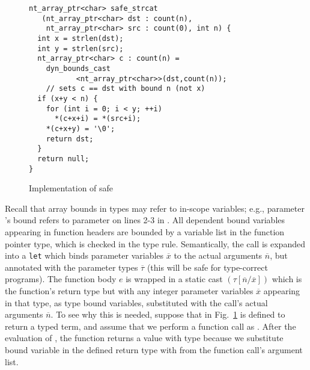 \begin{figure}[t]
{\small
{\captionsetup[lstlisting]{margin = 8 mm}
  \begin{lstlisting}[xleftmargin=8 mm]
nt_array_ptr<char> safe_strcat
   (nt_array_ptr<char> dst : count(n),
    nt_array_ptr<char> src : count(0), int n) {
  int x = strlen(dst);
  int y = strlen(src);
  nt_array_ptr<char> c : count(n) =
    dyn_bounds_cast
           <nt_array_ptr<char>>(dst,count(n));
    // sets c == dst with bound n (not x)
  if (x+y < n) {
    for (int i = 0; i < y; ++i)
      *(c+x+i) = *(src+i);
    *(c+x+y) = '\0';
    return dst;
  }
  return null;
}
  \end{lstlisting}
}
}
\caption{Implementation of safe }
\label{fig:strcat-ex}
\end{figure}

Recall that array
bounds in types may refer to in-scope variables; e.g., parameter
's bound  refers to parameter  on lines
2-3 in . 
All dependent bound variables appearing in function headers 
are bounded by a variable list in the function pointer type, which is checked in the type rule.
Semantically,
the call is expanded into a \texttt{let} which binds
parameter variables $\overline{x}$ to the actual arguments
$\overline{n}$, but annotated with the parameter types
$\overline{\tau}$ (this will be safe for type-correct programs). 
The function body $e$ is wrapped in a static cast
$(\tau[\overline{n} / \overline{x}])$ which is the function's return
type but with any integer parameter variables $\overline{x}$ appearing in that
type, as type bound variables,
substituted with the call's actual arguments $\overline{n}$.
To see why this is needed, suppose that  in
Fig.~\ref{fig:strcat-ex} is defined to return a
 typed term, and assume that we
perform a  function call as
. After the evaluation of , the
function returns a value with type 
because we substitute bound variable  in the 
defined return type with  from the function call's
argument list.


